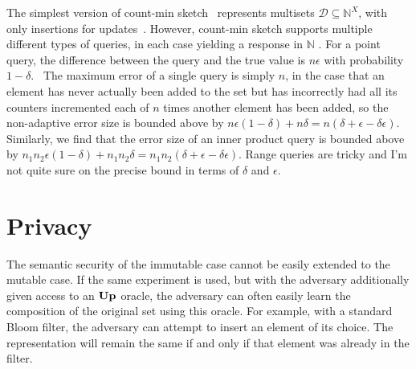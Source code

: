 \documentclass[11pt, pdftex]{article}
\newcommand{\UPO}{\oraclefont{Up}}
\begin{document}
The simplest version of count-min sketch~\cite{xxx} represents multisets $\mathcal{D} \subseteq \mathbb{N}^X$, with only insertions for updates~. However, count-min sketch supports multiple different types of queries, in each case yielding a response in $\mathbb{N}$ . For a point query, the difference between the query and the true value is $n\epsilon$ with probability $1-\delta$.~ The maximum error of a single query is simply $n$, in the case that an element has never actually been added to the set but has incorrectly had all its counters incremented each of $n$ times another element has been added, so the non-adaptive  error size is bounded above by $n\epsilon(1-\delta)+n\delta = n(\delta+\epsilon-\delta\epsilon)$.  Similarly, we find that the error size of an inner product query is bounded above by $n_1n_2\epsilon(1-\delta)+n_1n_2\delta = n_1n_2(\delta+\epsilon-\delta\epsilon)$. Range queries are tricky and I'm not quite sure on the precise bound in terms of $\delta$ and $\epsilon$.

\section{Privacy}

The semantic security of the immutable case cannot be easily extended to the mutable case. If the same experiment is used, but with the adversary additionally given access to an $\UPO$ oracle, the adversary can often easily learn the composition of the original set using this oracle. For example, with a standard Bloom filter, the adversary can attempt to insert an element of its choice. The representation will remain the same if and only if that element was already in the filter.
\end{document}
